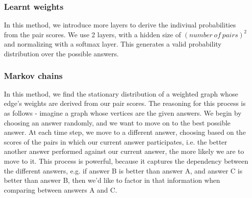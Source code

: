 \documentclass{article}
\begin{document}
\subsubsection{Learnt weights}

In this method, we introduce more layers to derive the indiviual probabilities from the pair scores. We use 2 layers, with a hidden size of $ (number\ of\ pairs)^2 $ and normalizing with a softmax layer. This generates a valid probability distribution over the possible answers.

\subsubsection{Markov chains}

In this method, we find the stationary distribution of a weighted graph whose edge's weights are derived from our pair scores.
The reasoning for this process is as follows - imagine a graph whose vertices are the given answers. We begin by choosing an answer randomly, and we want to move on to the best possible answer. At each time step, we move to a different answer, choosing based on the scores of the pairs in which our current answer participates, i.e. the better another answer performed against our current answer, the more likely we are to move to it.
This process is powerful, because it captures the dependency between the different answers, e.g. if answer B is better than answer A, and answer C is better than answer B, then we'd like to factor in that information when comparing between answers A and C. 

\end{document}
